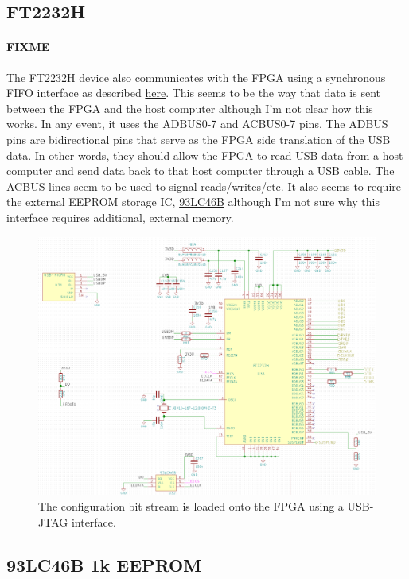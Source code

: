 \subsection{FT2232H}
\label{sec:ft2232h}

\paragraph{FIXME} The FT2232H device also communicates with the FPGA using a synchronous FIFO interface as described
\href{http://www.ftdichip.com/Support/Documents/AppNotes/AN_130_FT2232H_Used_In_FT245\%20Synchronous\%20FIFO\%20Mode.pdf}{here}. This
seems to be the way that data is sent between the FPGA and the host computer although I'm not clear how this works. In
any event, it uses the ADBUS0-7 and ACBUS0-7 pins. The ADBUS pins are bidirectional pins that serve as the FPGA side
translation of the USB data. In other words, they should allow the FPGA to read USB data from a host computer and send
data back to that host computer through a USB cable. The ACBUS lines seem to be used to signal reads/writes/etc. It also
seems to require the external EEPROM storage IC,
\href{http://ww1.microchip.com/downloads/en/DeviceDoc/20001749K.pdf}{93LC46B} although I'm not sure why this interface
requires additional, external memory.

\begin{figure}[h]
  \centering
  \includegraphics[width=\textwidth]{data/usb-ft2232.png}
  \caption{The configuration bit stream is loaded onto the FPGA using a USB-JTAG interface.}
  \label{fig:usb-ft2232}
\end{figure}

\subsection{93LC46B 1k EEPROM}
\label{sec:93lc46b}

